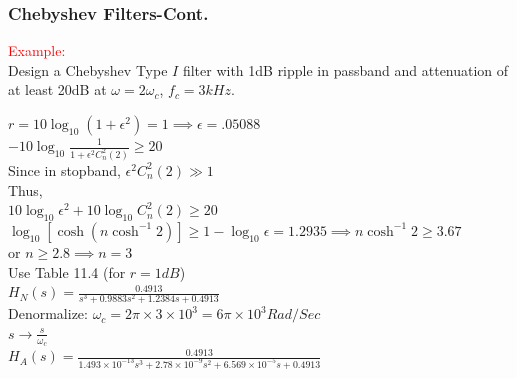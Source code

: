 \documentclass[mathserif, 10pt]{beamer} %
\begin{document}
\frame
{
\small
\frametitle{Chebyshev Filters-Cont.}


\textcolor{red}{Example:}\\ \vspace{.05in}
Design a Chebyshev Type $I$ filter with 1dB ripple in passband and attenuation of at least 20dB at $\omega = 2\omega_c$, $f_c = 3 kHz$.\\ \vspace{.05in}

$r = 10 \log_{10} {(1+\epsilon^2)} = 1 \implies \epsilon = .05088$\\ \vspace{.05in}
$-10\log_{10} \frac{1}{1+\epsilon^2C_n^2(2)} \ge 20$\\ \vspace{.05in}
Since in stopband, $\epsilon^2C_n^2(2) \gg1 $\\ \vspace{.06in}
Thus, \\
$10 \log_{10}{\epsilon^2} + 10 \log_{10} {C_n^2(2)} \ge 20$\\ \vspace{.05in}
$\log_{10}{[\cosh(n\cosh^{-1} 2)]} \ge 1- \log_{10} \epsilon = 1.2935 \implies n \cosh^{-1} 2 \ge 3.67 $\\ \vspace{.05in}
or  $ n \ge 2.8 \implies n=3$\\ \vspace{.06in}
Use Table 11.4 (for $r=1dB$)\\ \vspace{.06in}
$H_N(s) = \frac{0.4913}{s^3+0.9883s^2 +1.2384s + 0.4913}$\\ \vspace{.06in}
Denormalize: $\omega_c = 2\pi \times 3 \times 10^3 = 6\pi \times10^3 Rad/Sec$\\ \vspace{.06in}
$s \to \frac{s}{\omega_c}$\\ \vspace{.05in}
$H_A(s) = \frac{0.4913}{1.493 \times 10^{-13}s^3+2.78 \times 10^{-9}s^2+6.569 \times 10^{-5} s + 0.4913}$


}
\end{document}
